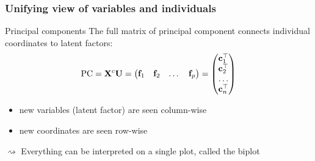 \documentclass{beamer}\usepackage[]{graphicx}\usepackage[]{color}
\begin{document}
\begin{frame}[fragile]
  \frametitle{Unifying view of variables and individuals}

  \begin{block}{Principal components}
   The full matrix of principal component connects  individual coordinates to latent factors:
    \begin{equation*}
      \mathrm{PC} = \mathbf{X}^c \mathbf{U} = \begin{pmatrix}
      \mathbf{f}_{1} & \mathbf{f}_{2} & \dots & \mathbf{f}_{p}
      \end{pmatrix}
      = \begin{pmatrix} 
      \mathbf{c}_{1}^\top \\ \mathbf{c}_{2}^\top \\\dots \\ \mathbf{c}_{n}^\top 
      \end{pmatrix}
    \end{equation*}
  \end{block}

  \vfill
  
  \begin{itemize}
    \item new variables (latent factor) are seen column-wise
    \item new coordinates are seen row-wise
  \end{itemize}

  $\rightsquigarrow$ Everything can be interpreted on a single plot, called the biplot

\end{frame}
\end{document}
